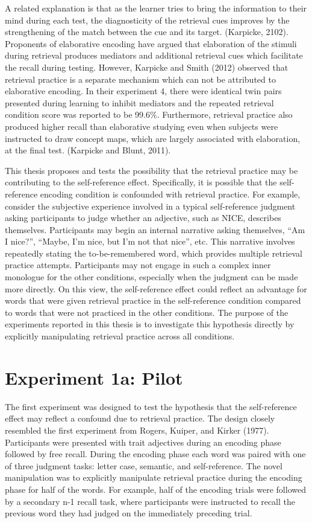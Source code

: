 \documentclass[
  man,floatsintext]{apa6}
\begin{document}
A related explanation is that as the learner tries to bring the information to their mind during each test, the diagnosticity of the retrieval cues improves by the strengthening of the match between the cue and its target. (Karpicke, 2102). Proponents of elaborative encoding have argued that elaboration of the stimuli during retrieval produces mediators and additional retrieval cues which facilitate the recall during testing. However, Karpicke and Smith (2012) observed that retrieval practice is a separate mechanism which can not be attributed to elaborative encoding. In their experiment 4, there were identical twin pairs presented during learning to inhibit mediators and the repeated retrieval condition score was reported to be 99.6\%. Furthermore, retrieval practice also produced higher recall than elaborative studying even when subjects were instructed to draw concept maps, which are largely associated with elaboration, at the final test. (Karpicke and Blunt, 2011).

This thesis proposes and tests the possibility that the retrieval practice may be contributing to the self-reference effect. Specifically, it is possible that the self-reference encoding condition is confounded with retrieval practice. For example, consider the subjective experience involved in a typical self-reference judgment asking participants to judge whether an adjective, such as NICE, describes themselves. Participants may begin an internal narrative asking themselves, ``Am I nice?'', ``Maybe, I'm nice, but I'm not that nice'', etc. This narrative involves repeatedly stating the to-be-remembered word, which provides multiple retrieval practice attempts. Participants may not engage in such a complex inner monologue for the other conditions, especially when the judgment can be made more directly. On this view, the self-reference effect could reflect an advantage for words that were given retrieval practice in the self-reference condition compared to words that were not practiced in the other conditions. The purpose of the experiments reported in this thesis is to investigate this hypothesis directly by explicitly manipulating retrieval practice across all conditions.

\hypertarget{experiment-1a-pilot}{%
\section{Experiment 1a: Pilot}\label{experiment-1a-pilot}}

The first experiment was designed to test the hypothesis that the self-reference effect may reflect a confound due to retrieval practice. The design closely resembled the first experiment from Rogers, Kuiper, and Kirker (1977). Participants were presented with trait adjectives during an encoding phase followed by free recall. During the encoding phase each word was paired with one of three judgment tasks: letter case, semantic, and self-reference. The novel manipulation was to explicitly manipulate retrieval practice during the encoding phase for half of the words. For example, half of the encoding trials were followed by a secondary n-1 recall task, where participants were instructed to recall the previous word they had judged on the immediately preceding trial.
\end{document}
